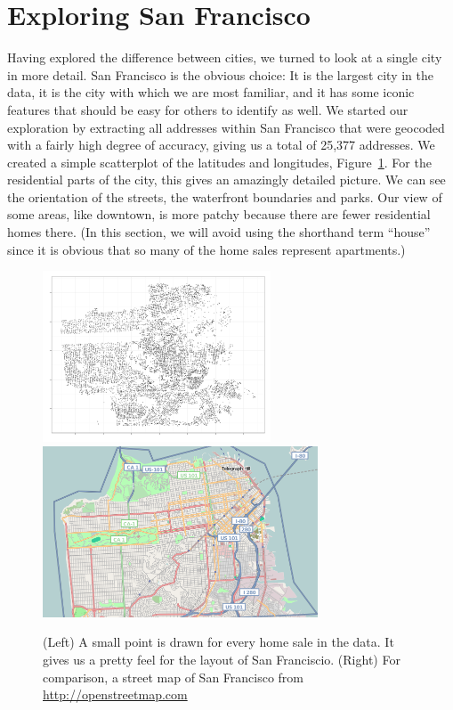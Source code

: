 \documentclass[oneside]{article}
\begin{document}

\section{Exploring San Francisco}

Having explored the difference between cities, we turned to look at a single city in more detail.  San Francisco is the obvious choice:  It is the largest city in the data, it is the city with which we are most familiar, and it has some iconic features that should be easy for others to identify as well.  We started our exploration by extracting all addresses within San Francisco that were geocoded with a fairly high degree of accuracy, giving us a total of 25,377 addresses.  We created a simple scatterplot of the latitudes and longitudes, Figure~\ref{fig:sf-geo}.  For the residential parts of the city, this gives an amazingly detailed picture.  We can see the orientation of the streets, the waterfront boundaries and parks.  Our view of some areas, like downtown, is more patchy because there are fewer residential homes there.  (In this section, we will avoid using the shorthand term ``house'' since it is obvious that so many of the home sales represent apartments.)

\begin{figure}[htbp]
  \centering
  \includegraphics[height=2in]{sf-geo}%
  \includegraphics[height=2in]{sf-map}
  \caption{(Left) A small point is drawn for every home sale in the data.  It gives us a pretty feel for the layout of San Franciscio. (Right) For comparison, a street map of San Francisco from \url{http://openstreetmap.com}}
  \label{fig:sf-geo}
\end{figure}
\end{document}
